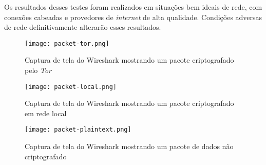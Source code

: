 Os resultados desses testes foram realizados em situações bem ideais de rede, com conexões cabeadas e provedores de \textit{internet} de alta qualidade. Condições adversas de rede definitivamente alterarão esses resultados.

\begin{figure}[H]
\centering
\texttt{[image: packet-tor.png]}
\caption{Captura de tela do Wireshark mostrando um pacote criptografado pelo \textit{Tor}}
\label{fig:packet-tor}
\end{figure}

\begin{figure}[H]
\centering
\texttt{[image: packet-local.png]}
\caption{Captura de tela do Wireshark mostrando um pacote criptografado em rede local}
\label{fig:packet-local}
\end{figure}

\begin{figure}[H]
\centering
\texttt{[image: packet-plaintext.png]}
\caption{Captura de tela do Wireshark mostrando um pacote de dados não criptografado}
\label{fig:packet-plaintext}
\end{figure}